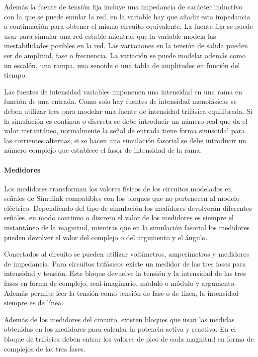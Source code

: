 \documentclass{book}
\begin{document}
Adem\'as la fuente de tensi\'on fija incluye una impedancia de car\'acter inductivo con la que se puede emular la red, en la variable hay que añadir esta impedancia a continuaci\'on para obtener el mismo circuito equivalente. La fuente fija se puede usar para simular una red estable mientras que la variable modela las inestabilidades posibles en la red. Las variaciones en la tensi\'on de salida pueden ser de amplitud, fase o frecuencia. La variaci\'on se puede modelar adem\'as como un escal\'on, una rampa, una senoide o una tabla de amplitudes en funci\'on del tiempo. \par

Las fuentes de intensidad variables imponenen una intensidad en una rama en funci\'on de una entrada. Como solo hay fuentes de intensidad monof\'asicas se deben utilizar tres para modelar una fuente de intensidad trif\'asica equilibrada. Si la simulaci\'on es continua o discreta se debe introducir un n\'umero real que da el valor instant\'aneo, normalmente la señal de entrada tiene forma sinusoidal para las corrientes alternas, si se hacen una simulaci\'on fasorial se debe introducir un n\'umero complejo que establece el fasor de intensidad de la rama. \par

		\paragraph {Medidores}
Los medidores transforman los valores f\'isicos de los circuitos modelados en señales de Simulink compatibles con los bloques que no pertenecen al modelo el\'ectrico. Dependiendo del tipo de simulaci\'on los medidores devolver\'an diferentes señales, en modo continuo o discreto el valor de los medidores es siempre el instant\'aneo de la magnitud, mientras que en la simulaci\'on fasorial los medidores pueden devolver el valor del complejo o del argumento y el \'angulo. \par

Conectados al circuito se pueden utilizar volt\'imetros, amper\'imetros y medidores de impedancia. Para circuitos trif\'asicos existe un medidor de las tres fases para intensidad y tensi\'on. Este bloque devuelve la tensi\'on y la intensidad de las tres fases en forma de complejo, real-imaginario, m\'odulo o m\'odulo y argumento. Adem\'as permite leer la tensi\'on como tensi\'on de fase o de l\'inea, la intensidad siempre es de l\'inea. \par

Adem\'as de los medidores del circuito, existen bloques que usan las medidas obtenidas en los medidores para calcular la potencia activa y reactiva. En el bloque de trif\'asica deben entrar los valores de pico de cada magnitud en forma de complejos de las tres fases. \par
 
\end{document}
